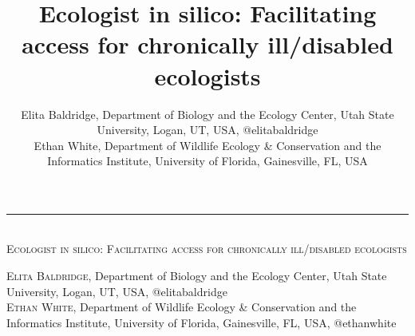 \documentclass{beamer}
\author{Elita Baldridge, Department of Biology and the Ecology Center, Utah State University, Logan, UT, USA, @elitabaldridge\\Ethan White, Department of Wildlife Ecology \& Conservation and the Informatics Institute, University of Florida, Gainesville, FL, USA}
\title[17pt]{Ecologist in silico: Facilitating access for chronically ill/disabled ecologists}
\date{}
\begin{document}
\begin{center} 
\begin{huge}
\rule{\linewidth}{3cm}
\textsc{%
\\Ecologist in silico: Facilitating access for chronically ill/disabled ecologists\\
 }
\end{huge}  
\begin{large}
\textsc{Elita Baldridge}, Department of Biology and the Ecology Center, Utah State University, Logan, UT, USA, @elitabaldridge\\  
\textsc{Ethan White}, Department of Wildlife Ecology \& Conservation and the Informatics Institute, University of Florida, Gainesville, FL, USA, @ethanwhite\\
\end{large}
\end{center}
\end{document}
